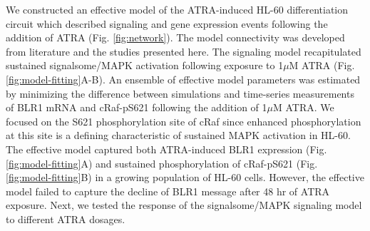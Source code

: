 \documentclass[12pt]{article}
\begin{document}
We constructed an effective model of the ATRA-induced HL-60 differentiation circuit which described signaling and gene expression events following the addition of ATRA (Fig. \ref{fig:network}).
The model connectivity was developed from literature and the studies presented here.
The signaling model recapitulated sustained signalsome/MAPK activation following exposure to 1$\mu$M ATRA (Fig. \ref{fig:model-fitting}A-B).
An ensemble of effective model parameters was estimated by minimizing the difference between simulations and time-series measurements of BLR1 mRNA and
cRaf-pS621 following the addition of 1$\mu$M ATRA.
We focused on the S621 phosphorylation site of cRaf since enhanced phosphorylation at this site is a defining characteristic of  sustained MAPK activation in HL-60.
The effective model captured both ATRA-induced BLR1 expression (Fig. \ref{fig:model-fitting}A) and sustained phosphorylation of cRaf-pS621 (Fig. \ref{fig:model-fitting}B)
in a growing population of HL-60 cells. However, the effective model failed to capture the decline of BLR1 message after 48 hr of ATRA exposure.
Next, we tested the response of the signalsome/MAPK signaling model to different ATRA dosages.

\end{document}
